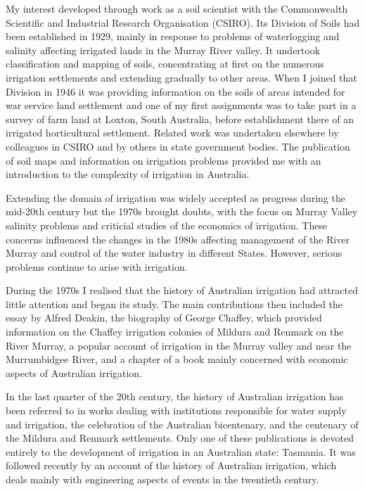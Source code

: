 My interest developed through work as a soil scientist with the
Commonwealth Scientific and Industrial Research Organisation
(CSIRO). Its Division of Soils had been established in 1929, mainly in
response to problems of waterlogging and salinity affecting irrigated
lands in the Murray River valley.  It undertook classification and
mapping of soils, concentrating at first on the numerous irrigation
settlements and extending gradually to other areas.  When I joined
that Division in 1946 it was providing information on the soils of
areas intended for war service land settlement and one of my first
assignments was to take part in a survey of farm land at Loxton, South
Australia, before establishment there of an irrigated horticultural
settlement.  Related work was undertaken elsewhere by colleagues in
CSIRO and by others in state government bodies.  The publication of
soil maps and information on irrigation problems provided me with an
introduction to the complexity of irrigation in Australia.

Extending the domain of irrigation was widely accepted as progress
during the mid-20th century but the 1970s brought doubts, with the
focus on Murray Valley salinity problems and criticial studies of the
economics of irrigation.  These concerns influenced the changes in the
1980s affecting management of the River Murray and control of the
water industry in different States.  However, serious problems
continue to arise with irrigation.

During the 1970s I realised that the history of Australian irrigation
had attracted little attention and began its study.  The main
contributions then included the essay by Alfred Deakin, the biography
of George Chaffey, which provided information on the Chaffey
irrigation colonies of Mildura and Renmark on the River Murray, a
popular account of irrigation in the Murray valley and near the
Murrumbidgee River, and a chapter of a book mainly concerned with
economic aspects of Australian irrigation.

In the last quarter of the 20th century, the history of Australian
irrigation has been referred to in works dealing with institutions
responsible for water supply and irrigation, the celebration of the
Australian bicentenary, and the centenary of the Mildura and Renmark
settlements.  Only one of these publications is devoted entirely to
the development of irrigation in an Australian state: Tasmania. It was
followed recently by an account of the history of Australian
irrigation, which deals mainly with engineering aspects of events in
the twentieth century.

